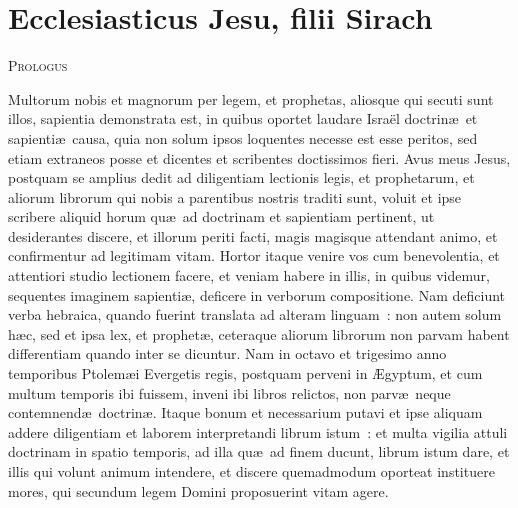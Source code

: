 {\centering \section*{Ecclesiasticus Jesu, filii Sirach}}\thispagestyle{empty}

\begin{center}\textsc{Prologus}\end{center}\vspace{-6pt} Multorum nobis et magnorum per legem, et prophetas, aliosque qui secuti sunt illos, sapientia demonstrata est, in quibus oportet laudare Isra\"el doctrin\ae\ et sapienti\ae\ causa, quia non solum ipsos loquentes necesse est esse peritos, sed etiam extraneos posse et dicentes et scribentes doctissimos fieri. Avus meus Jesus, postquam se amplius dedit ad diligentiam lectionis legis, et prophetarum, et aliorum librorum qui nobis a parentibus nostris traditi sunt, voluit et ipse scribere aliquid horum qu\ae\ ad doctrinam et sapientiam pertinent, ut desiderantes discere, et illorum periti facti, magis magisque attendant animo, et confirmentur ad legitimam vitam. Hortor itaque venire vos cum benevolentia, et attentiori studio lectionem facere, et veniam habere in illis, in quibus videmur, sequentes imaginem sapienti\ae , deficere in verborum compositione. Nam deficiunt verba hebraica, quando fuerint translata ad alteram linguam~: non autem solum h\ae c, sed et ipsa lex, et prophet\ae , ceteraque aliorum librorum non parvam habent differentiam quando inter se dicuntur. Nam in octavo et trigesimo anno temporibus Ptolem\ae i Evergetis regis, postquam perveni in \AE gyptum, et cum multum temporis ibi fuissem, inveni ibi libros relictos, non parv\ae\ neque contemnend\ae\ doctrin\ae . Itaque bonum et necessarium putavi et ipse aliquam addere diligentiam et laborem interpretandi librum istum~: et multa vigilia attuli doctrinam in spatio temporis, ad illa qu\ae\ ad finem ducunt, librum istum dare, et illis qui volunt animum intendere, et discere quemadmodum oporteat instituere mores, qui secundum legem Domini proposuerint vitam agere. 

